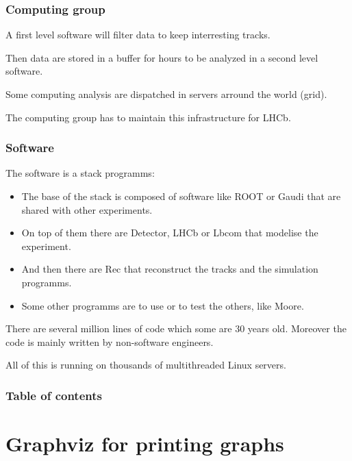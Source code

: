 \documentclass{beamer}
\begin{document}
    \begin{frame}
        \frametitle{Computing group}

        A first level software will filter data to keep interresting tracks.

        Then data are stored in a buffer for hours to be analyzed in a second level software.

        Some computing analysis are dispatched in servers arround the world (grid).

        The computing group has to maintain this infrastructure for LHCb.
    \end{frame}

    \begin{frame}
        \frametitle{Software}

        The software is a stack programms:

        \begin{itemize}
            \item The base of the stack is composed of software like ROOT or Gaudi that are shared with other experiments.
            \item On top of them there are Detector, LHCb or Lbcom that modelise the experiment.
            \item And then there are Rec that reconstruct the tracks and the simulation programms.
            \item Some other programms are to use or to test the others, like Moore.
        \end{itemize}

        There are several million lines of code which some are 30 years old.
        Moreover the code is mainly written by non-software engineers.

        All of this is running on thousands of multithreaded Linux servers.
    \end{frame}

    \begin{frame}
        \frametitle{Table of contents}
        \tableofcontents
    \end{frame}

\section{Graphviz for printing graphs}
\end{document}
